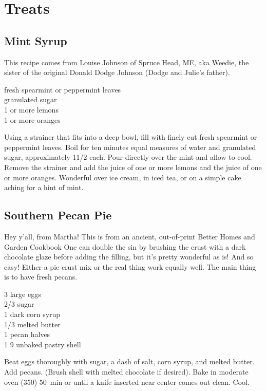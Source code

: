 \chapter{Treats}

\section{Mint Syrup}

\begin{open}
    This recipe comes from Louise Johnson of Spruce Head, ME, aka Weedie, the sister of the original Donald Dodge Johnson (Dodge and Julie’s father).
\end{open}
\begin{ingredients}
    fresh spearmint or peppermint leaves\\
    granulated sugar\\
    1 or more lemons\\
    1 or more oranges
\end{ingredients}
Using a strainer that fits into a deep bowl, fill with finely cut fresh spearmint or peppermint leaves. Boil for ten minutes equal measures of water and granulated sugar, approximately 1\SI{1/2}{\cup} each. Pour directly over the mint and allow to cool. Remove the strainer and add the juice of one or more lemons and the juice of one or more oranges. Wonderful over ice cream, in iced tea, or on a simple cake aching for a hint of mint.

\section{Southern Pecan Pie
\label{sec:pecanpie}
}

\begin{open}
Hey y'all, from Martha! This is from an ancient, out-of-print Better Homes and Garden Cookbook One can double the sin by brushing the crust with a dark chocolate glaze before adding the filling, but it's pretty wonderful as is! And so easy! Either a pie crust mix or the real thing work equally well. The main thing is to have fresh pecans.
\end{open}
\begin{ingredients}
    3 large eggs\\
    \SI{2/3}{\cup} sugar\\
    \SI{1}{\cup} dark corn syrup\\
    \SI{1/3}{\cup} melted butter\\
    \SI{1}{\cup} pecan halves\\
    1 \SI{9}{\inch} unbaked pastry shell
\end{ingredients}
Beat eggs thoroughly with sugar, a dash of salt, corn syrup, and melted butter.
Add pecans. (Brush shell with melted chocolate if desired). Bake in moderate
oven (\SI{350}{\degreeF}) \SI{50}{\minute} or until a knife inserted near center
comes out clean. Cool.

